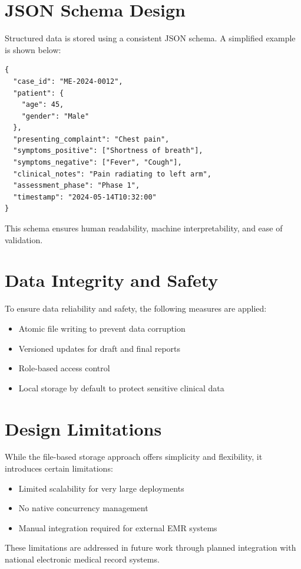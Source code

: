 \documentclass[12pt,a4paper]{report}
\begin{document}
\section{JSON Schema Design}
Structured data is stored using a consistent JSON schema. A simplified example is shown below:

\begin{verbatim}
{
  "case_id": "ME-2024-0012",
  "patient": {
    "age": 45,
    "gender": "Male"
  },
  "presenting_complaint": "Chest pain",
  "symptoms_positive": ["Shortness of breath"],
  "symptoms_negative": ["Fever", "Cough"],
  "clinical_notes": "Pain radiating to left arm",
  "assessment_phase": "Phase 1",
  "timestamp": "2024-05-14T10:32:00"
}
\end{verbatim}

This schema ensures human readability, machine interpretability, and ease of validation.

\section{Data Integrity and Safety}
To ensure data reliability and safety, the following measures are applied:
\begin{itemize}
    \item Atomic file writing to prevent data corruption
    \item Versioned updates for draft and final reports
    \item Role-based access control
    \item Local storage by default to protect sensitive clinical data
\end{itemize}

\section{Design Limitations}
While the file-based storage approach offers simplicity and flexibility, it introduces certain limitations:
\begin{itemize}
    \item Limited scalability for very large deployments
    \item No native concurrency management
    \item Manual integration required for external EMR systems
\end{itemize}

These limitations are addressed in future work through planned integration with national electronic medical record systems.
\end{document}
